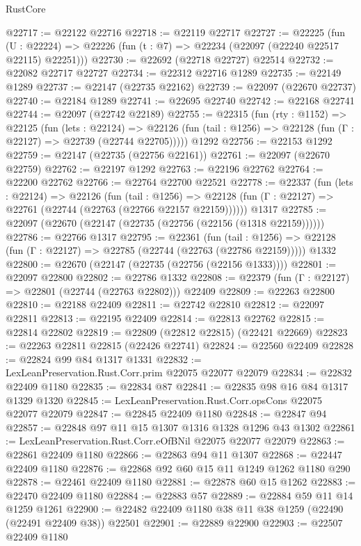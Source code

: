 \begin{lexlean}{RustCore}
\begin{coremodule}
@22717 := @22122 @22716
@22718 := @22119 @22717
@22727 := @22225
    (fun (U : @22224) => @22226 (fun (t : @7) => @22234 (@22097 (@22240 @22517 @22115) @22251)))
@22730 := @22692 (@22718 @22727) @22514
@22732 := @22082 @22717 @22727
@22734 := @22312 @22716 @1289
@22735 := @22149 @1289
@22737 := @22147 (@22735 @22162)
@22739 := @22097 (@22670 @22737)
@22740 := @22184 @1289
@22741 := @22695 @22740
@22742 := @22168 @22741
@22744 := @22097 (@22742 @22189)
@22755 := @22315
    (fun (rty : @1152) =>
    @22125
      (fun (lets : @22124) =>
      @22126 (fun (tail : @1256) => @22128 (fun (Γ : @22127) => @22739 (@22744 @22705)))))
    @1292
@22756 := @22153 @1292
@22759 := @22147 (@22735 (@22756 @22161))
@22761 := @22097 (@22670 @22759)
@22762 := @22197 @1292
@22763 := @22196 @22762
@22764 := @22200 @22762
@22766 := @22764 @22700 @22521
@22778 := @22337
    (fun (lets : @22124) =>
    @22126
      (fun (tail : @1256) =>
      @22128 (fun (Γ : @22127) => @22761 (@22744 (@22763 (@22766 @22157 @22159))))))
    @1317
@22785 := @22097 (@22670 (@22147 (@22735 (@22756 (@22156 (@1318 @22159))))))
@22786 := @22766 @1317
@22795 := @22361
    (fun (tail : @1256) => @22128 (fun (Γ : @22127) => @22785 (@22744 (@22763 (@22786 @22159)))))
    @1332
@22800 := @22670 (@22147 (@22735 (@22756 (@22156 @1333))))
@22801 := @22097 @22800
@22802 := @22786 @1332
@22808 := @22379 (fun (Γ : @22127) => @22801 (@22744 (@22763 @22802))) @22409
@22809 := @22263 @22800
@22810 := @22188 @22409
@22811 := @22742 @22810
@22812 := @22097 @22811
@22813 := @22195 @22409
@22814 := @22813 @22762
@22815 := @22814 @22802
@22819 := @22809 (@22812 @22815) (@22421 @22669)
@22823 := @22263 @22811 @22815 (@22426 @22741)
@22824 := @22560 @22409
@22828 := @22824 @99 @84 @1317 @1331
@22832 := LexLeanPreservation.Rust.Corr.prim @22075 @22077 @22079
@22834 := @22832 @22409 @1180
@22835 := @22834 @87
@22841 := @22835 @98 @16 @84 @1317 @1329 @1320
@22845 := LexLeanPreservation.Rust.Corr.opsCons @22075 @22077 @22079
@22847 := @22845 @22409 @1180
@22848 := @22847 @94
@22857 := @22848 @97 @11 @15 @1307 @1316 @1328 @1296 @43 @1302
@22861 := LexLeanPreservation.Rust.Corr.eOfBNil @22075 @22077 @22079
@22863 := @22861 @22409 @1180
@22866 := @22863 @94 @11 @1307
@22868 := @22447 @22409 @1180
@22876 := @22868 @92 @60 @15 @11 @1249 @1262 @1180 @290
@22878 := @22461 @22409 @1180
@22881 := @22878 @60 @15 @1262
@22883 := @22470 @22409 @1180
@22884 := @22883 @57
@22889 := @22884 @59 @11 @14 @1259 @1261
@22900 := @22482 @22409 @1180 @38 @11 @38 @1259 (@22490 (@22491 @22409 @38)) @22501
@22901 := @22889 @22900
@22903 := @22507 @22409 @1180

\end{coremodule}
\end{lexlean}
